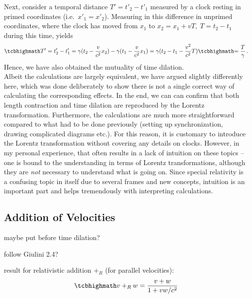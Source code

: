 Next, consider a temporal distance $T' = t'_2 - t'_1$ measured by a clock resting in primed coordinates (i.e.~$x'_1 = x'_2$). Measuring in this difference in unprimed coordinates, where the clock has moved from $x_1$ to $x_2 = x_1 + v T, \; T = t_2 - t_1$ during this time, yields
\begin{equation}
	\eqbox{T'} = t'_2 - t'_1 = \gamma (t_2 - \frac{v}{c^2} x_2) - \gamma (t_1 - \frac{v}{c^2} x_1) = \gamma (t_2 - t_1 - \frac{v^2}{c^2} T) \eqbox{= \frac{T}{\gamma}} \, .
\end{equation}
Hence, we have also obtained the mutuality of time dilation.\\


Albeit the calculations are largely equivalent, we have argued slightly differently here, which was done deliberately to show there is not a single correct way of calculating the corresponding effects. In the end, we can can confirm that both length contraction and time dilation are reproduced by the Lorentz transformation. Furthermore, the calculations are much more straightforward compared to what had to be done previously (setting up synchronization, drawing complicated diagrams etc.). For this reason, it is customary to introduce the Lorentz transformation without covering any details on clocks. However, in my personal experience, that often results in a lack of intuition on these topics -- one is bound to the understanding in terms of Lorentz transformations, although they are \emph{not} necessary to understand what is going on. Since special relativity is a confusing topic in itself due to several frames and new concepts, intuition is an important part and helps tremendously with interpreting calculations.



		\subsection{Addition of Velocities}
maybe put before time dilation?


follow Giulini 2.4?


result for relativistic addition $+_R$ (for parallel velocities):
\begin{equation}\label{eq:velocity_addition_parallel}
	\eqbox{
	v +_R w = \frac{v + w}{1 + v w / c^2}
	}
\end{equation}



